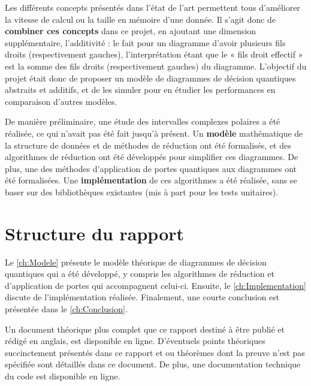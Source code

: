 Les différents concepts présentés dans l'état de l'art permettent tous d'améliorer la vitesse de calcul ou la taille en mémoire d'une donnée. Il s'agit donc de \textbf{combiner ces concepts} dans ce projet, en ajoutant une dimension supplémentaire, l'additivité : le fait pour un diagramme d'avoir plusieurs fils droits (respectivement gauches), l'interprétation étant que le « fils droit effectif » est la somme des fils droits (respectivement gauches) du diagramme.
L'objectif du projet était donc de proposer un modèle de diagrammes de décision quantiques abstraits et additifs, et de les simuler pour en étudier les performances en comparaison d'autres modèles.

De manière préliminaire, une étude des intervalles complexes polaires a été réalisée, ce qui n'avait pas été fait jusqu'à présent.
Un \textbf{modèle} mathématique de la structure de données et de méthodes de réduction ont été formalisés, et des algorithmes de réduction ont été développés pour simplifier ces diagrammes.
De plus, une des méthodes d'application de portes quantiques aux diagrammes ont été formalisées.
Une \textbf{implémentation} de ces algorithmes a été réalisée, sans se baser sur des bibliothèques existantes (mis à part pour les tests unitaires).

\section{Structure du rapport}
\label{sec:Structure}

Le \autoref{ch:Modele} présente le modèle théorique de diagrammes de décision quantiques qui a été développé, y compris les algorithmes de réduction et d'application de portes qui accompagnent celui-ci. Ensuite, le \autoref{ch:Implementation} discute de l'implémentation réalisée. Finalement, une courte conclusion est présentée dans le \autoref{ch:Conclusion}.

Un document théorique plus complet que ce rapport destiné à être publié et rédigé en anglais, est disponible en ligne. D'éventuels points théoriques succinctement présentés dans ce rapport et ou théorèmes dont la preuve n'est pas spécifiée sont détaillés dans ce document. \cite{Leroy_2025} De plus, une documentation technique du code est disponible en ligne. \cite{Leroy_doc}
